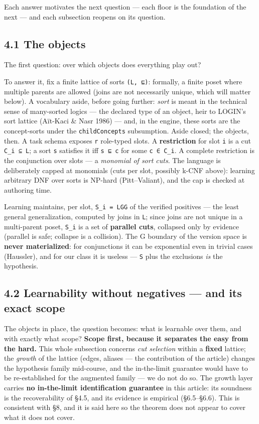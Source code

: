 \documentclass[11pt]{article}
\begin{document}
Each answer motivates the next question — each floor is the foundation of the next — and each subsection reopens on its question.

\subsection*{4.1 The objects}

The first question: over which objects does everything play out?

To answer it, fix a finite lattice of sorts \texttt{(L, ⊑)}: formally, a finite poset where multiple parents are allowed (joins are not necessarily unique, which will matter below). A vocabulary aside, before going further: \emph{sort} is meant in the technical sense of many-sorted logics — the declared type of an object, heir to LOGIN's sort lattice (Aït-Kaci \& Nasr 1986) — and, in the engine, these sorts are the concept-sorts under the \texttt{childConcepts} subsumption. Aside closed; the objects, then. A task schema exposes \texttt{r} role-typed slots. A \textbf{restriction} for slot \texttt{i} is a cut \texttt{C\_i ⊆ L}; a sort \texttt{s} satisfies it iff \texttt{s ⊑ c} for some \texttt{c ∈ C\_i}. A complete restriction is the conjunction over slots — a \emph{monomial of sort cuts}. The language is deliberately capped at monomials (cuts per slot, possibly k-CNF above): learning arbitrary DNF over sorts is NP-hard (Pitt–Valiant), and the cap is checked at authoring time.

Learning maintains, per slot, \texttt{S\_i = LGG} of the verified positives — the least general generalization, computed by joins in \texttt{L}; since joins are not unique in a multi-parent poset, \texttt{S\_i} is a set of \textbf{parallel cuts}, collapsed only by evidence (parallel is safe; collapse is a collision). The G boundary of the version space is \textbf{never materialized}: for conjunctions it can be exponential even in trivial cases (Haussler), and for our class it is useless — \texttt{S} plus the exclusions \emph{is} the hypothesis.

\subsection*{4.2 Learnability without negatives — and its exact scope}

The objects in place, the question becomes: what is learnable over them, and with exactly what scope? \textbf{Scope first, because it separates the easy from the hard.} This whole subsection concerns \emph{cut selection} within a \textbf{fixed} lattice; the \emph{growth} of the lattice (edges, aliases — the contribution of the article) changes the hypothesis family mid-course, and the in-the-limit guarantee would have to be re-established for the augmented family — we do not do so. The growth layer carries \textbf{no in-the-limit identification guarantee} in this article: its soundness is the recoverability of §4.5, and its evidence is empirical (§6.5–§6.6). This is consistent with §8, and it is said here so the theorem does not appear to cover what it does not cover.
\end{document}
